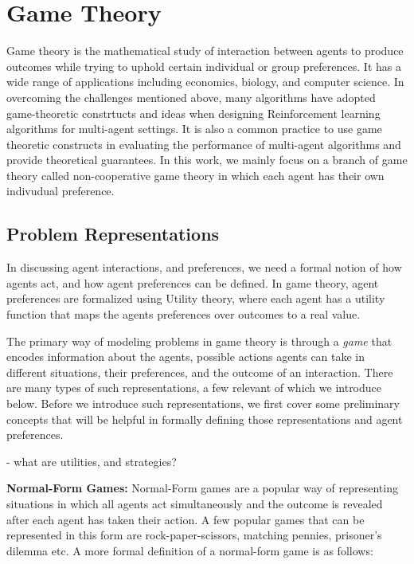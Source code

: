\section{Game Theory}

Game theory is the mathematical study of interaction between agents to produce outcomes while
trying to uphold certain individual or group preferences.
It has a wide range of applications including economics, biology, and computer science.
In overcoming the challenges mentioned above, many algorithms have adopted game-theoretic
constrtucts and ideas when designing Reinforcement learning algorithms for multi-agent settings.
It is also a common practice to use game theoretic constructs in evaluating the performance of
multi-agent algorithms and provide theoretical guarantees.
In this work, we mainly focus on a branch of game theory called non-cooperative game theory in
which each agent has their own indivudual preference.

\subsection{Problem Representations}

In discussing agent interactions, and preferences, we need a formal notion of how agents act, and
how agent preferences can be defined.
In game theory, agent preferences are formalized using Utility theory, where each agent has a
utility function that maps the agents preferences over outcomes to a real value.

The primary way of modeling problems in game theory is through a \textit{game} that encodes
information about the agents, possible actions agents can take in different situations, their
preferences, and the outcome of an interaction.
There are many types of such representations, a few relevant of which we introduce below.
Before we introduce such representations, we first cover some preliminary concepts that will be
helpful in formally defining those representations and agent preferences.

- what are utilities, and strategies?

\textbf{Normal-Form Games:} Normal-Form games are a popular way of representing situations in which all agents act
simultaneously and the outcome is revealed after each agent has taken their action.
A few popular games that can be represented in this form are rock-paper-scissors, matching pennies,
prisoner's dilemma etc. A more formal definition of a normal-form game is as follows:

